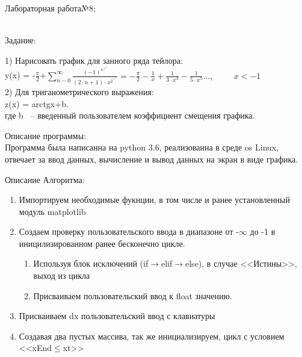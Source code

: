 \documentclass[a4paper]{article}
\begin{document}
\newpage
Лабораторная работа№8;
\\
    \begin{lab1}
        \begin{center}\underline{\hspace{6cm}}\\
            Задание:
        \end{center}
        1) Нарисовать график для занного ряда тейлора:\\
        y(x) = -$\frac{\pi}{2}$+$\displaystyle\sum_{n-0}^{\infty}\frac{(-1)^n^+^1}{(2\cdot n+1)\cdot x^2^\cdot ^n^+^1} = -\frac{\pi}{2} - \frac{1}{x}+\frac{1}{3\cdot x^3} - \frac{1}{5\cdot x^5}\dots,\hspace{1cm} x<-1$\\
        2) Для триганометрического выражения:\\
        z(x) = arctgx+b.\\
        где b ~-- введенный пользователем коэффициент смещения графика.
    \begin{description}
        Описание программы:\\
        \small{Программа была написанна на python 3.6, реализованна в среде os Linux, отвечает за ввод данных, вычисление и вывод данных на экран в виде графика.}
    \end{description}
    \begin{algoritm}
        Описание Алгоритма:
        \small\begin{enumerate}
            \item 
                Импортируем необходимые фукнции, в том числе и ранее установленный модуль matplotlib
            \item
                Создаем проверку пользовательского ввода в диапазоне от -$\infty$ до -1 в иницилизированном ранее бесконечно цикле.
            \begin{enumerate}
                \item 
                    Используя блок исключений (if$\to$elif$\to$else), в случае <<Истины>>, выход из цикла
                \item 
                    Присваиваем пользовательский ввод к float значению.
            \end{enumerate}
            \item 
                Присваиваем dx пользовательский ввод с клавиатуры
            \item 
                Создавая два пустых массива, так же инициализируем, цикл с условием <<xEnd$\leq$xt>>

\end{enumerate}
\end{algoritm}
\end{lab1}
\end{document}
